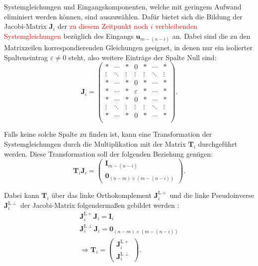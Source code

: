 Systemgleichungen und Eingangskomponenten, welche mit geringem Aufwand eliminiert werden können, sind auszuwählen. Dafür bietet sich die Bildung der Jacobi-Matrix $\mathbf{J}_i$ der  \textcolor{red}{zu diesem Zeitpunkt noch $i$ verbleibenden Systemgleichungen} bezüglich des Eingangs $\mathbf{u}_{m-(n-i)}$ an. Dabei sind die zu den Matrixzeilen korrespondierenden Gleichungen geeignet, in denen nur ein isolierter Spalteneintrag $\varepsilon \neq 0$ steht, also weitere Einträge der Spalte Null sind:
\begin{equation}
	\mathbf{J}_i = 
	\begin{pmatrix}
	* & \cdots & * & 0 & * & \cdots & *\\
	\vdots & \ddots & \vdots & \vdots & \vdots & \ddots & \vdots \\
	* & \cdots & * & 0 & * & \cdots & *  \\
	* & \cdots & * & \varepsilon & * & \cdots & * \\
	* & \cdots & * & 0 & * & \cdots & *  \\
	\vdots & \ddots & \vdots & \vdots & \vdots & \ddots & \vdots \\
	* & \cdots & * & 0 & * & \cdots & *\\
	\end{pmatrix}.
\end{equation}

Falls keine solche Spalte zu finden ist, kann eine Transformation der Systemgleichungen durch die Multiplikation mit der Matrix $\mathbf{T}_i$ durchgeführt werden. Diese Transformation soll der folgenden Beziehung genügen:
\begin{equation}
	\mathbf{T}_i \mathbf{J}_i = 
	\begin{pmatrix}
		\mathbf{I}_{m-(n-i)} \\
		\mathbf{0}_{(n-m) \times (m-(n-i))}
	\end{pmatrix}.
\end{equation}

Dabei kann $\mathbf{T}_i$ über das linke Orthokomplement $\mathbf{J}_i^{\mathrm{L} +}$ und die linke Pseudoinverse $\mathbf{J}_i^{\mathrm{L} \perp}$ der Jacobi-Matrix folgendermaßen gebildet werden \cite[Abschnitt 2.1.2]{Fritzsche2016}:
\begin{align}
	\mathbf{J}_i^{\mathrm{L} +} \mathbf{J}_i = \mathbf{I}_i \\
	\mathbf{J}_i^{\mathrm{L} \perp} \mathbf{J}_i = \mathbf{0}_{(n-m) \times (m-(n-i))} \\
	\Rightarrow \mathbf{T}_i = 
	\begin{pmatrix}
		\mathbf{J}_i^{\mathrm{L} +} \\
		\mathbf{J}_i^{\mathrm{L} \perp}
	\end{pmatrix} .
\end{align}

